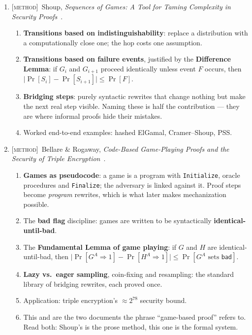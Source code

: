 \documentclass[11pt]{article}
\newcommand{\kind}[1]{{\footnotesize\textsc{\textcolor{yearcolor}{[#1]}}}\ }
\newcommand{\method}{\kind{method}}
\newcommand{\paper}[3]{#1, \emph{#2}~\cite{#3}.}
\begin{document}
\begin{enumerate}
  \item \method \paper{Shoup}{Sequences of Games: A Tool for Taming Complexity
    in Security Proofs}{Shou04}
    \begin{enumerate}
      \item \textbf{Transitions based on indistinguishability}: replace a
        distribution with a computationally close one; the hop costs one
        assumption.
      \item \textbf{Transitions based on failure events}, justified by the
        \textbf{Difference Lemma}: if $G_i$ and $G_{i+1}$ proceed identically
        unless event $F$ occurs, then
        $\lvert \Pr[S_i] - \Pr[S_{i+1}] \rvert \le \Pr[F]$.
      \item \textbf{Bridging steps}: purely syntactic rewrites that change
        nothing but make the next real step visible. Naming these is half the
        contribution --- they are where informal proofs hide their mistakes.
      \item Worked end-to-end examples: hashed ElGamal, Cramer--Shoup, PSS.
    \end{enumerate}

  \item \method \paper{Bellare \& Rogaway}{Code-Based Game-Playing Proofs and
    the Security of Triple Encryption}{BR04,BR06}
    \begin{enumerate}
      \item \textbf{Games as pseudocode}: a game is a program with
        \texttt{Initialize}, oracle procedures and \texttt{Finalize}; the
        adversary is linked against it. Proof steps become \emph{program}
        rewrites, which is what later makes mechanization possible.
      \item The \textbf{bad flag} discipline: games are written to be
        syntactically \textbf{identical-until-bad}.
      \item The \textbf{Fundamental Lemma of game playing}: if $G$ and $H$ are
        identical-until-bad, then
        $\lvert \Pr[G^A \Rightarrow 1] - \Pr[H^A \Rightarrow 1] \rvert
        \le \Pr[G^A \text{ sets } \mathsf{bad}]$.
      \item \textbf{Lazy vs.\ eager sampling}, coin-fixing and resampling: the
        standard library of bridging rewrites, each proved once.
      \item Application: triple encryption's $\approx 2^{78}$ security bound.
      \item This and \cite{Shou04} are the two documents the phrase
        ``game-based proof'' refers to. Read both: Shoup's is the prose method,
        this one is the formal system.
    \end{enumerate}


\end{enumerate}
\end{document}
